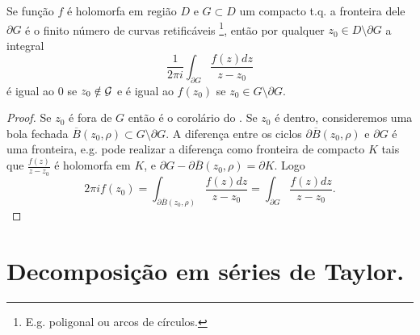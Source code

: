 \begin{teorema}
\label{formula-cauchy}
Se função $f$ é holomorfa em região $D$ e $G\subset D$ um compacto t.q. a fronteira dele $\partial G$ é o finito número de curvas retificáveis
\footnote{E.g. poligonal ou arcos de círculos.},
então por qualquer $z_0 \in D \setminus \partial G$ a integral
\[ \frac1{2\pi i} \int_{\partial G} \frac{f(z)dz}{z-z_0} \]
é igual ao $0$ se $z_0 \notin \mathcal{G}$ e é igual ao $f(z_0)$ se $z_0 \in G \setminus \partial G$.
\end{teorema}
\begin{proof}
Se $z_0$ é fora de $G$ então é o corolário do .
Se $z_0$ é dentro, consideremos uma bola fechada $\overline{B}(z_0,\rho)\subset G \setminus \partial G$.
A diferença entre os ciclos $\partial \overline{B}(z_0,\rho)$ e $\partial G$ é uma fronteira,
e.g. pode realizar a diferença como fronteira de compacto $K$ tais que $\frac{f(z)}{z-z_0}$ é holomorfa em $K$,
e $\partial G - \partial \overline{B}(z_0,\rho) = \partial K$.
Logo 
\[ 2\pi i f(z_0) = \int_{\partial \overline{B}(z_0,\rho)} \frac{f(z)dz}{z-z_0} = \int_{\partial G} \frac{f(z)dz}{z-z_0}. \]
\end{proof}

\section{Decomposição em séries de Taylor.}

